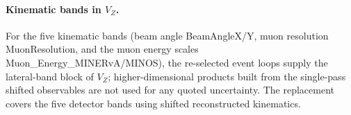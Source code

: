 \paragraph{Kinematic bands in $V_Z$.} For the five kinematic bands (beam angle BeamAngleX/Y, muon resolution MuonResolution, and the muon energy scales Muon\_Energy\_MINERvA/MINOS), the re-selected event loops supply the lateral-band block of $V_Z$; higher-dimensional products built from the single-pass shifted observables are not used for any quoted uncertainty. The replacement covers the five detector bands using shifted reconstructed kinematics.


